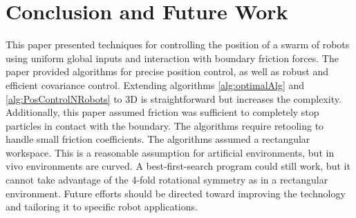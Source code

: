 \section{Conclusion and Future Work}\label{sec:conclusion}

This paper presented techniques for controlling the position of a swarm of robots using uniform global inputs and interaction with boundary friction forces.  
The paper provided algorithms for precise position control, as well as robust and efficient covariance control. 
Extending algorithms \ref{alg:optimalAlg} and \ref{alg:PosControlNRobots}  to 3D is straightforward but increases the complexity.
 Additionally, this paper assumed friction was sufficient to completely stop particles in contact with the boundary. 
  The algorithms require retooling to handle small friction coefficients. 
 The algorithms assumed a rectangular workspace.  This is a reasonable assumption for artificial environments, but in vivo environments are curved.  
 A best-first-search program could still work, but it cannot take advantage of the 4-fold rotational symmetry as in a rectangular environment.
Future efforts should be directed toward improving the technology and tailoring it to specific robot applications.


  
    



